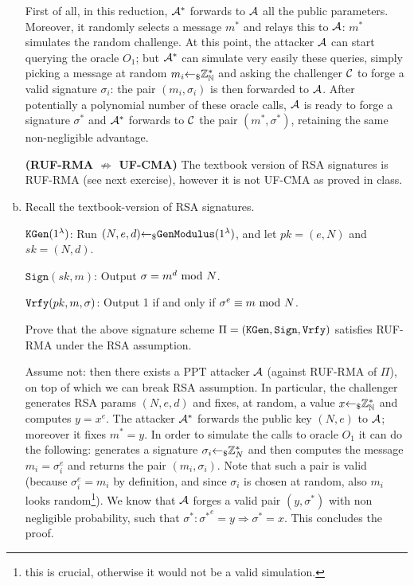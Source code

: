 \begin{enumerate}[(a)]
\begin{solution}
		      First of all, in this reduction, $\mathcal{A}^*$ forwards to $\mathcal{A}$ all the public parameters. Moreover, it randomly selects a message $m^*$ and relays this to $\mathcal{A}$: $m^*$ simulates the random challenge. At this point, the attacker $\mathcal{A}$ can start querying the oracle $O_1$; but $\mathcal{A}^*$ can simulate very easily these queries, simply picking a message at random $m_i {\leftarrow_\$} {\mathbb Z}_{\mathbb N}^*$ and asking the challenger $\mathcal{C}$ to forge a valid signature $\sigma_i$: the pair $(m_i, \sigma_i)$ is then forwarded to $\mathcal{A}$. After potentially a polynomial number of these oracle calls, $\mathcal{A}$ is ready to forge a signature $\sigma^*$ and $\mathcal{A}^*$ forwards to $\mathcal{C}$ the pair $(m^*, \sigma^*)$, retaining the same non-negligible advantage.

		      \bigskip
		      \textbf{(RUF-RMA $\not\Rightarrow$ UF-CMA)}
		      The textbook version of RSA signatures is RUF-RMA (see next exercise), however it is not UF-CMA as proved in class.
	      \end{solution}

	\item Recall the textbook-version of RSA signatures.

	      $\texttt{KGen}(1^\lambda)$: Run $(N, e, d) {\leftarrow_\$} \texttt{GenModulus}(1^\lambda)$, and let $pk = (e, N)$ and $sk = (N, d)$.

	      $\texttt{Sign}(sk, m)$: Output $\sigma = m^d \mbox{ mod }  N$.

	      $\texttt{Vrfy}(pk, m, \sigma)$: Output 1 if and only if $\sigma^e \equiv m \mbox{ mod }  N$.

	      Prove that the above signature scheme $\Pi = (\texttt{KGen}, \texttt{Sign}, \texttt{Vrfy})$ satisfies RUF-RMA under the RSA assumption.

	      \begin{solution}
		      Assume not: then there exists a PPT attacker $\mathcal{A}$ (against RUF-RMA of $\Pi$), on top of which we can break RSA assumption. In particular, the challenger generates RSA params $(N, e, d)$ and fixes, at random, a value $x {\leftarrow_\$} {\mathbb Z}_{\mathbb N}^*$ and computes $y = x^e$. The attacker $\mathcal{A}^*$ forwards the public key $(N, e)$ to $\mathcal{A}$; moreover it fixes $m^* = y$. In order to simulate the calls to oracle $O_1$ it can do the following: generates a signature $\sigma_i {\leftarrow_\$} {\mathbb Z}_N^*$ and then computes the message $m_i = \sigma_i^e$ and returns the pair $(m_i, \sigma_i)$. Note that such a pair is valid (because $\sigma_i^e = m_i$ by definition, and since $\sigma_i$ is chosen at random, also $m_i$ looks random\footnote{this is crucial, otherwise it would not be a valid simulation.}). We know that $\mathcal{A}$ forges a valid pair $(y, \sigma^*)$ with non negligible probability, such that $\sigma^*: {\sigma^*}^e = y \Rightarrow \sigma^* = x$. This concludes the proof.
	      \end{solution}
\end{enumerate}